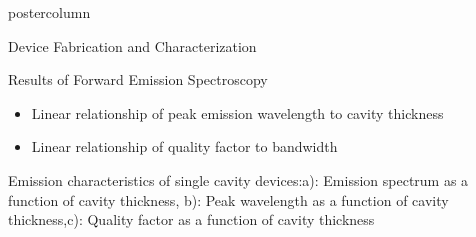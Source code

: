 \documentclass[final]{beamer}
\begin{document}
\begin{frame}
\begin{columns}
\begin{column}{.49\textwidth}
\begin{beamercolorbox}[center,wd=\textwidth]{postercolumn}
\begin{minipage}[T]{.99\textwidth}
{\begin{block}{Device Fabrication and Characterization}
            \vspace{2cm}
            \end{block}
			\vfill
            \begin{block}{Results of Forward Emission Spectroscopy}
                \begin{minipage}{0.3\textwidth}
                    \begin{itemize}
                     \item Linear relationship of peak emission wavelength to cavity thickness \newline
                     \item Linear relationship of quality factor to bandwidth
                    \end{itemize}
                    \vspace{2cm}
                    \begin{flushleft}
                    \small Emission characteristics of single cavity devices:\vspace{0.5cm}\newline a): Emission spectrum as a function of cavity thickness, \vspace{0.5cm}\newline b): Peak wavelength as a function of cavity thickness,\vspace{0.5cm}\newline c): Quality factor as a function of cavity thickness

\end{flushleft}
\end{minipage}
\end{block}}
\end{minipage}
\end{beamercolorbox}
\end{column}
\end{columns}
\end{frame}
\end{document}
